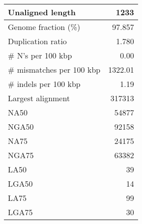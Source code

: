 \documentclass[12pt,a4paper]{article}
\begin{document}
\begin{table}[ht]
\begin{center}
\begin{tabular}{|l*{1}{|r}|}
Unaligned length & 1233 \\ \hline
Genome fraction (\%) & 97.857 \\ \hline
Duplication ratio & 1.780 \\ \hline
\# N's per 100 kbp & 0.00 \\ \hline
\# mismatches per 100 kbp & 1322.01 \\ \hline
\# indels per 100 kbp & 1.19 \\ \hline
Largest alignment & 317313 \\ \hline
NA50 & 54877 \\ \hline
NGA50 & 92158 \\ \hline
NA75 & 24175 \\ \hline
NGA75 & 63382 \\ \hline
LA50 & 39 \\ \hline
LGA50 & 14 \\ \hline
LA75 & 99 \\ \hline
LGA75 & 30 \\ \hline
\end{tabular}
\end{center}
\end{table}
\end{document}
